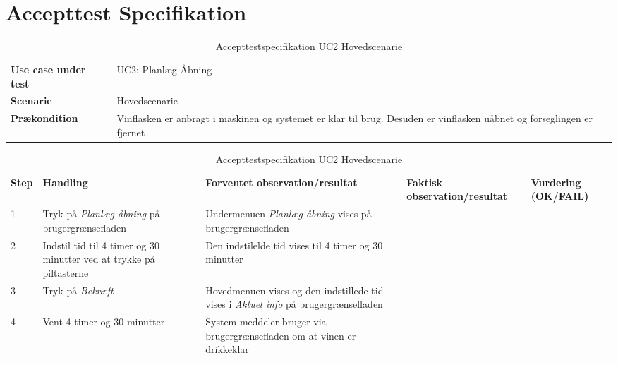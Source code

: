 \chapter{Accepttest Specifikation}

\begin{table}[H]
	
	\centering
	\caption{Accepttestspecifikation UC2 Hovedscenarie}
	\label{ATUC2:Hovedscenarie}
\begin{tabular}{| p{80pt}  p{320pt} |}\hline
\rowcolor{lightgray}	
\textbf{Use case under test} & UC2: Planlæg Åbning \\
\rowcolor{white}
\textbf{Scenarie} & Hovedscenarie \\\rowcolor{lightgray}	
\textbf{Prækondition} &
Vinflasken er anbragt i maskinen og systemet er klar til brug. Desuden er vinflasken uåbnet og forseglingen er fjernet \\
	\hline
\end{tabular}
\begin{tabular}{ | p{26pt} p{100pt}  p{101pt} | p{67pt} | p{68pt} |}
	\textbf{Step} & \textbf{Handling} & \textbf{Forventet observation/resultat} & \textbf{Faktisk observation/resultat} & \textbf{Vurdering (OK/FAIL)}\\
	1 & Tryk på \emph{Planlæg åbning} på brugergrænsefladen & Undermenuen \emph{Planlæg åbning} vises på brugergrænsefladen &  &  \\
	2 & Indstil tid til 4 timer og 30 minutter ved at trykke på piltasterne & Den indstilelde tid vises til 4 timer og 30 minutter &  &  \\
	3 & Tryk på \emph{Bekræft} & Hovedmenuen vises og den indstillede tid vises i \emph{Aktuel info} på brugergrænsefladen &  &  \\
	4 & Vent 4 timer og 30 minutter & System meddeler bruger via brugergrænsefladen om at vinen er drikkeklar &  &  \\
	\hline
\end{tabular}
\end{table}



